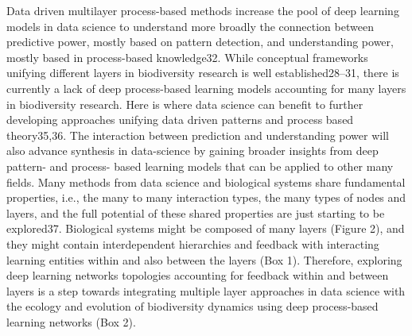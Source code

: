 \documentclass[authoryear,1p,12pt]{elsarticle}
\begin{document}
Data driven multilayer process-based methods increase the pool of deep learning models in data
science to understand more broadly the connection between predictive
power, mostly based on pattern detection, and understanding power,
mostly based in process-based knowledge32. While conceptual frameworks
unifying different layers in biodiversity research is well
established28–31, there is currently a lack of deep process-based
learning models accounting for many layers in biodiversity
research. Here is where data science can benefit to further developing
approaches unifying data driven patterns and process based
theory35,36. The interaction between prediction and understanding
power will also advance synthesis in data-science by gaining broader
insights from deep pattern- and process- based learning models that
can be applied to other many fields. Many methods from data science
and biological systems share fundamental properties, i.e., the many to
many interaction types, the many types of nodes and layers, and the
full potential of these shared properties are just starting to be
explored37. Biological systems might be composed of many layers
(Figure 2), and they might contain interdependent hierarchies and
feedback with interacting learning entities within and also between
the layers (Box 1). Therefore, exploring deep learning networks
topologies accounting for feedback within and between layers is a step
towards integrating multiple layer approaches in data science with the
ecology and evolution of biodiversity dynamics using deep
process-based learning networks (Box 2).
\end{document}
